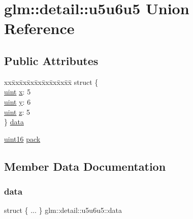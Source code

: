 \hypertarget{unionglm_1_1detail_1_1u5u6u5}{}\section{glm\+:\+:detail\+:\+:u5u6u5 Union Reference}
\label{unionglm_1_1detail_1_1u5u6u5}
\subsection*{Public Attributes}
\begin{DoxyCompactItemize}
\item 
\begin{tabbing}
xx\=xx\=xx\=xx\=xx\=xx\=xx\=xx\=xx\=\kill
struct \{\\
\>\hyperlink{group__core__precision_ga4fd29415871152bfb5abd588334147c8}{uint} \hyperlink{unionglm_1_1detail_1_1u5u6u5_ae265d637dd0e4430f3e96a509e19fb06}{x}: 5\\
\>\hyperlink{group__core__precision_ga4fd29415871152bfb5abd588334147c8}{uint} \hyperlink{unionglm_1_1detail_1_1u5u6u5_ab60581ca18c5faa107d8cbd5cfa946c9}{y}: 6\\
\>\hyperlink{group__core__precision_ga4fd29415871152bfb5abd588334147c8}{uint} \hyperlink{unionglm_1_1detail_1_1u5u6u5_ae0c24b8bea4457e78fe32f6e0cee6369}{z}: 5\\
\} \hyperlink{unionglm_1_1detail_1_1u5u6u5_ad4670f9777cab7784f9657693d365630}{data}\\

\end{tabbing}\item 
\hyperlink{namespaceglm_1_1detail_a47b2a7d006d187338e8031a352d1ce56}{uint16} \hyperlink{unionglm_1_1detail_1_1u5u6u5_a5ea89c1a491b7e1442cad93d92628b2e}{pack}
\end{DoxyCompactItemize}


\subsection{Member Data Documentation}
\mbox{\label{unionglm_1_1detail_1_1u5u6u5_ad4670f9777cab7784f9657693d365630}} 
\subsubsection{\texorpdfstring{data}{data}}
{\footnotesize\ttfamily struct \{ ... \}   glm\+::detail\+::u5u6u5\+::data}

